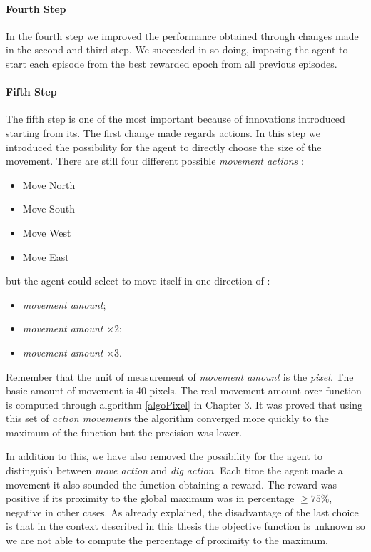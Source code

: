\paragraph{Fourth Step} In the fourth step we improved the performance obtained through changes made in the second and third step. We succeeded in so doing, imposing the agent to start each episode from the best rewarded epoch from all previous episodes.

\paragraph{Fifth Step} The fifth step is one of the most important because of innovations introduced starting from its. The first change made regards actions. In this step we introduced the possibility for the agent to directly choose the size of the movement. There are still four different possible \textit{movement actions} :

\begin{itemize}
	\item Move North
	\item Move South
	\item Move West
	\item Move East
\end{itemize}

but the agent could select to move itself in one direction of :

\begin{itemize}
	\item \textit{movement amount};
	\item \textit{movement amount} $\times 2$;
	\item \textit{movement amount} $\times 3$.
\end{itemize}

Remember that the unit of measurement of \textit{movement amount} is the \textit{pixel}. The basic amount of movement is 40 pixels. The real movement amount over function is computed through algorithm \ref{algoPixel} in Chapter $3$. It was proved that using this set of \textit{action movements} the algorithm converged more quickly to the maximum of the function but the precision was lower. 

In addition to this, we have also removed the possibility for the agent to distinguish between \textit{move action} and \textit{dig action}. Each time the agent made a movement it also sounded the function obtaining a reward. The reward was positive if its proximity to the global maximum was in percentage $\ge 75\%$, negative in other cases. As already explained, the disadvantage of the last choice is that in the context described in this thesis the objective function is unknown so we are not able to compute the percentage of proximity to the maximum.

